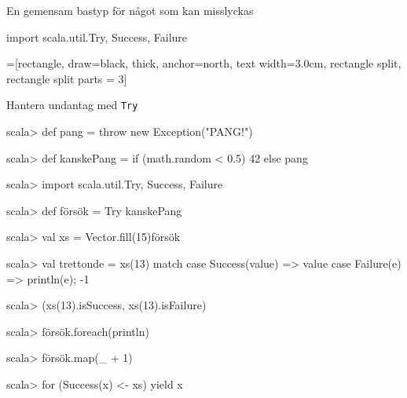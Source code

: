 
\begin{Slide}{En gemensam bastyp för något som kan misslyckas}\SlideFontSmall
\begin{Code}
import scala.util.{Try, Success, Failure}
\end{Code}

\vspace{-0.5em}\begin{center}
\newcommand{\TextBox}[1]{\raisebox{0pt}[1em][0.5em]{#1}}
=[rectangle, draw=black,  thick, anchor=north, text width=3.0cm, rectangle split, rectangle split parts = 3]
\end{center}
\end{Slide}

\begin{Slide}{Hantera undantag med \texttt{Try}}
\vspace{-0.5em}\begin{REPL}
scala> def pang = throw new Exception("PANG!")

scala> def kanskePang = if (math.random < 0.5) 42 else pang

scala> import scala.util.{Try, Success, Failure}

scala> def försök = Try { kanskePang }

scala> val xs = Vector.fill(15){försök}

scala> val trettonde = xs(13) match {
         case Success(value) => value
         case Failure(e) => println(e); -1
       }

scala> (xs(13).isSuccess, xs(13).isFailure)

scala> försök.foreach(println)

scala> försök.map(_ + 1)

scala> for (Success(x) <- xs) yield x
\end{REPL}
\end{Slide}

